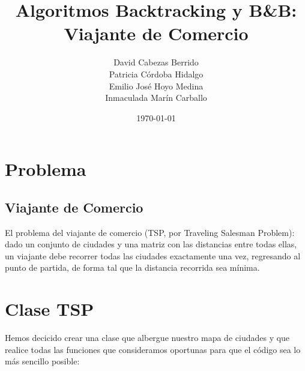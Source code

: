 \documentclass[a4]{article}
\author{David Cabezas Berrido \\ Patricia Córdoba Hidalgo \\ Emilio José Hoyo Medina \\ Inmaculada Marín Carballo}
\date{\vspace{1mm} \today}
\title{\huge Algoritmos Backtracking y B\&B: \\Viajante de Comercio \HRule\vspace{-4mm} }
\begin{document}
\maketitle
\vspace{5mm}
\tableofcontents
\newpage

\section{Problema}
\subsection{Viajante de Comercio}
El problema del viajante de comercio (TSP, por Traveling Salesman Problem): dado un conjunto de ciudades y una matriz con las distancias entre todas ellas, un viajante debe recorrer todas las ciudades exactamente una vez, regresando al punto de partida, de forma tal que la distancia recorrida sea mínima.


\section{Clase TSP}
Hemos decicido crear una clase que albergue nuestro mapa de ciudades y que realice todas las funciones que consideramos oportunas para que el código sea lo más sencillo posible:
\end{document}
